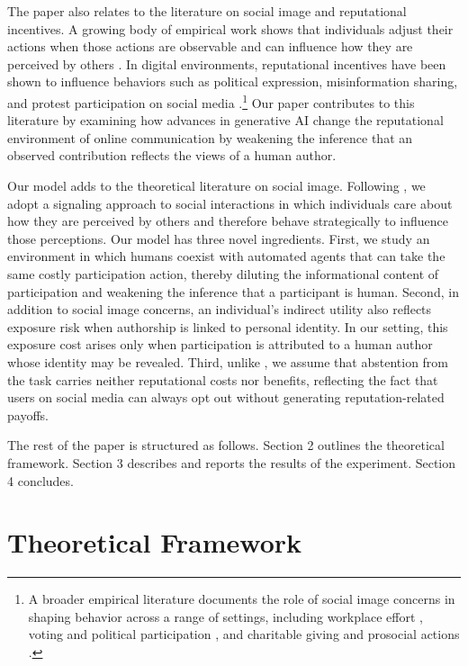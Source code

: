 \documentclass[12pt,notitlepage]{article}
\theoremstyle{plain}
\theoremstyle{plain}
\theoremstyle{definition}
\theoremstyle{definition}
\theoremstyle{assumption}
\theoremstyle{plain}
\theoremstyle{plain}
\theoremstyle{plain}
\theoremstyle{plain}
\theoremstyle{definition}%
\theoremstyle{plain}
\theoremstyle{plain}
\theoremstyle{plain}
\theoremstyle{plain}
\begin{document}
The paper also relates to the literature on social image and reputational incentives. A growing body of empirical work shows that individuals adjust their actions when those actions are observable and can influence how they are perceived by others \citep{BursztynJensen:17}. In digital environments, reputational incentives have been shown to influence behaviors such as political expression, misinformation sharing, and protest participation on social media \citep{enikolopov2020social,guriev2026,braghieri2024political}.\footnote{A broader empirical literature documents the role of social image concerns in shaping behavior across a range of settings, including workplace effort \citep{MasMoretti:09}, voting and political participation \citep{Funk:10,DellaVigna:17}, and charitable giving and prosocial actions \citep{DellaVigna:12,Ashraf:14}.} Our paper contributes to this literature by examining how advances in generative AI change the reputational environment of online communication by weakening the inference that an observed contribution reflects the views of a human author.

Our model adds to the theoretical literature on social image. Following \citet{BenabouTirole:06}, we adopt a signaling approach to social interactions in which individuals care about how they are perceived by others and therefore behave strategically to influence those perceptions. Our model has three novel ingredients. First, we study an environment in which humans coexist with automated agents that can take the same costly participation action, thereby diluting the informational content of participation and weakening the inference that a participant is human. Second, in addition to social image concerns, an individual's indirect utility also reflects exposure risk when authorship is linked to personal identity. In our setting, this exposure cost arises only when participation is attributed to a human author whose identity may be revealed. Third, unlike \citet{BenabouTirole:06}, we assume that abstention from the task carries neither reputational costs nor benefits, reflecting the fact that users on social media can always opt out without generating reputation-related payoffs.

The rest of the paper is structured as follows. Section 2 outlines
the theoretical framework. Section 3 describes and reports the results of the experiment. Section 4 concludes. 

\section{Theoretical Framework}\label{sec:theoretical framework}
\end{document}

